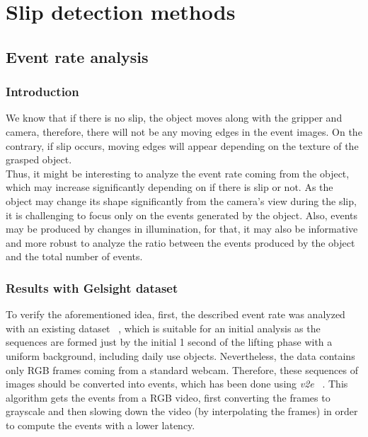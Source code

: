 \cleardoublepage
\chapter{Slip detection methods}\label{sec:methods}

\section{Event rate analysis}

\subsection{Introduction}

We know that if there is no slip, the object moves along with the gripper and camera, therefore, there will not be any moving edges in the event images. On the contrary, if slip occurs, moving edges will appear depending on the texture of the grasped object.\\

Thus, it might be interesting to analyze the event rate coming from the object, which may increase significantly depending on if there is slip or not. As the object may change its shape significantly from the camera's view during the slip, it is challenging to focus only on the events generated by the object. Also, events may be produced by changes in illumination, for that, it may also be informative and more robust to analyze the ratio between the events produced by the object and the total number of events.

\subsection{Results with Gelsight dataset}

To verify the aforementioned idea, first, the described event rate was analyzed with an existing dataset ~\cite{gelsight2018}, which is suitable for an initial analysis as the sequences are formed just by the initial 1 second of the lifting phase with a uniform background, including daily use objects. Nevertheless, the data contains only RGB frames coming from a standard webcam. Therefore, these sequences of images should be converted into events, which has been done using \textit{v2e} ~\cite{v2e}. This algorithm gets the events from a RGB video, first converting the frames to grayscale and then slowing down the video (by interpolating the frames) in order to compute the events with a lower latency.\\

